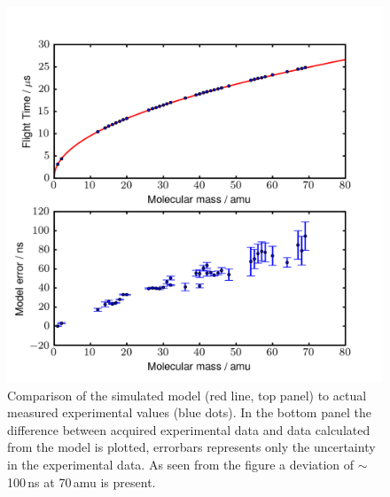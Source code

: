\documentclass[aip,rsi]{revtex4-1}
\begin{document}
\begin{figure}
 \includegraphics[width=14cm]{model_error.png}%
 \caption{Comparison of the simulated model (red line, top panel) to actual measured experimental values (blue dots). In the bottom panel the difference between acquired experimental data and data calculated from the model is plotted, errorbars represents only the uncertainty in the experimental data. As seen from the figure a deviation of $\sim$100\,ns at 70\,amu is present.\label{fig:model_error}}%
\end{figure}
\end{document}
